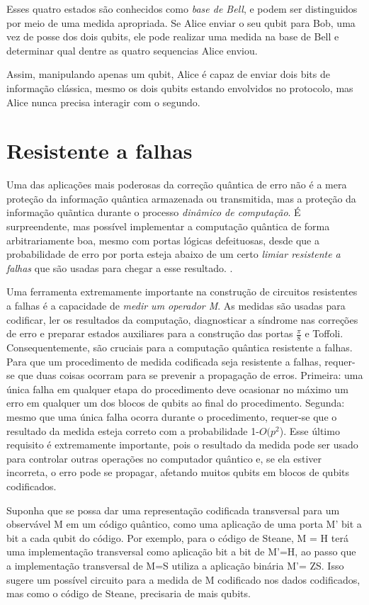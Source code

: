 \documentclass[tcc,capa]{texufpel}
\begin{document}
Esses quatro estados são conhecidos como \textit{base de Bell}, e podem ser distinguidos por meio de uma medida apropriada. Se Alice enviar o seu qubit para Bob, uma vez de posse dos dois qubits, ele pode realizar uma medida na base de Bell e determinar qual dentre as quatro sequencias Alice enviou.

Assim, manipulando apenas um qubit, Alice é capaz de enviar dois bits de informação clássica, mesmo os dois qubits estando envolvidos no protocolo, mas Alice nunca precisa interagir com o segundo.\cite{chuang00a}

\section{Resistente a falhas}
Uma das aplicações mais poderosas da correção quântica de erro não é a mera proteção da informação quântica armazenada ou transmitida, mas a proteção da informação quãntica durante o processo \emph{dinâmico de computação}. É surpreendente, mas possível implementar a computação quântica de forma arbitrariamente boa, mesmo com portas lógicas defeituosas, desde que a probabilidade de erro por porta esteja abaixo de um certo \emph{limiar resistente a falhas} que são usadas para chegar a esse resultado. \cite{chuang00a}.


Uma ferramenta extremamente importante na construção de circuitos resistentes a falhas é a capacidade de \textit{ medir um operador M}. As medidas são usadas para codificar, ler os resultados da computação, diagnosticar a síndrome nas correções de erro e preparar estados auxiliares para a construção das portas $\frac{\pi}{8}$ e Toffoli. Consequentemente, são cruciais para a computação quântica resistente a falhas. Para que um procedimento de medida codificada seja resistente a falhas, requer-se que duas coisas ocorram para se prevenir a propagação de erros. Primeira: uma única falha em qualquer etapa do procedimento deve ocasionar no máximo um erro em qualquer um dos blocos de qubits ao final do procedimento. Segunda: mesmo que uma única falha ocorra durante o procedimento, requer-se que o resultado da medida esteja correto com a probabilidade 1-$O(p^2$). Esse último requisito é extremamente importante, pois o resultado da medida pode ser usado para controlar outras operações no computador quântico e, se ela estiver incorreta, o erro pode se propagar, afetando muitos qubits em blocos de qubits codificados. 

Suponha que se possa dar uma representação codificada transversal para um observável M em um código quântico, como uma aplicação de uma porta M' bit a bit a cada qubit do código. Por exemplo, para o código de Steane, M = H terá uma implementação transversal como aplicação bit a bit de M'=H, ao passo que a implementação transversal de M=S utiliza a aplicação binária M'= ZS. Isso sugere um possível circuito para a medida de M codificado nos dados codificados, mas como o código de Steane, precisaria de mais qubits. 
\end{document}
